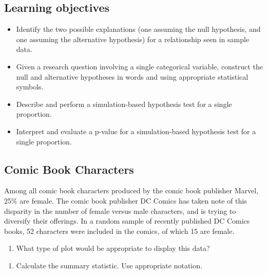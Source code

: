 \documentclass[
]{report}
\providecommand{\tightlist}{%
  \setlength{\itemsep}{0pt}\setlength{\parskip}{0pt}}
\begin{document}

\hypertarget{learning-objectives-8}{%
\subsection{Learning objectives}\label{learning-objectives-8}}

\begin{itemize}
\item
  Identify the two possible explanations (one assuming the null hypothesis, and one assuming the alternative hypothesis) for a relationship seen in sample data.
\item
  Given a research question involving a single categorical variable, construct the null and alternative hypotheses in words and using appropriate statistical symbols.
\item
  Describe and perform a simulation-based hypothesis test for a single proportion.
\item
  Interpret and evaluate a p-value for a simulation-based hypothesis test for a single proportion.
\end{itemize}

\hypertarget{comic-book-characters}{%
\subsection{Comic Book Characters}\label{comic-book-characters}}

Among all comic book characters produced by the comic book publisher Marvel, 25\% are female. The comic book publisher DC Comics has taken note of this disparity in the number of female versus male characters, and is trying to diversify their offerings. In a random sample of recently published DC Comics books, 52 characters were included in the comics, of which 15 are female.

\begin{enumerate}
\def\labelenumi{\arabic{enumi}.}
\tightlist
\item
  What type of plot would be appropriate to display this data?
\end{enumerate}

\vspace{0.3in}

\begin{enumerate}
\def\labelenumi{\arabic{enumi}.}
\setcounter{enumi}{1}
\tightlist
\item
  Calculate the summary statistic. Use appropriate notation.
\end{enumerate}
\end{document}
